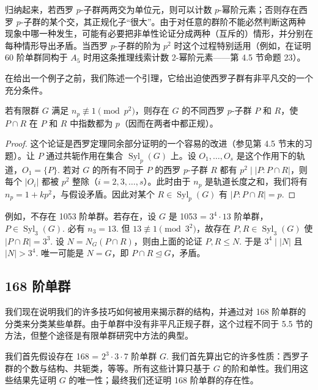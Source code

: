 归纳起来，若西罗 \(p\)-子群两两交为单位元，则可以计数 \(p\)-幂阶元素；否则存在西罗 \(p\)-子群的某个交，其正规化子“很大”。由于对任意的群阶不能必然判断这两种现象中哪一种发生，可能有必要把非单性论证分成两种（互斥的）情形，并分别在每种情形导出矛盾。当西罗 \(p\)-子群的阶为 \(p^2\) 时这个过程特别适用（例如，在证明 60 阶单群同构于 \(A_5\) 时用这条推理线索计数 2-幂阶元素——第 4.5 节命题 23）。

在给出一个例子之前，我们陈述一个引理，它给出迫使西罗子群有非平凡交的一个充分条件。

\begin{lemma}\label{lem:6.13}
若有限群 \(G\) 满足 \(n_p \not\equiv 1 \pmod{p^2}\)，则存在 \(G\) 的不同西罗 \(p\)-子群 \(P\) 和 \(R\)，使 \(P \cap R\) 在 \(P\) 和 \(R\) 中指数都为 \(p\)（因而在两者中都正规）。
\end{lemma}

\begin{proof}
这个论证是西罗定理同余部分证明的一个容易的改进（参见第 4.5 节末的习题）。让 \(P\) 通过共轭作用在集合 \(\operatorname{Syl}_p(G)\) 上。设 \(O_1, \ldots, O_s\) 是这个作用下的轨道，\(O_1 = \{P\}\). 若对 \(G\) 的所有不同于 \(P\) 的西罗 \(p\)-子群 \(R\) 都有 \(p^2 \mid |P : P \cap R|\)，则每个 \(|O_i|\) 都被 \(p^2\) 整除（\(i = 2, 3, \ldots, s\)）。此时由于 \(n_p\) 是轨道长度之和，我们将有 \(n_p = 1 + kp^2\)，与假设矛盾。因此对某个 \(R \in \operatorname{Syl}_p(G)\) 有 \(|P : P \cap R| = p\).
\end{proof}

例如，不存在 1053 阶单群。若存在，设 \(G\) 是 1053 = \(3^4 \cdot 13\) 阶单群，\(P \in \operatorname{Syl}_3(G)\). 必有 \(n_3 = 13\). 但 \(13 \not\equiv 1 \pmod{3^2}\)，故存在 \(P, R \in \operatorname{Syl}_3(G)\) 使 \(|P \cap R| = 3^3\). 设 \(N = N_G(P \cap R)\)，则由上面的论证 \(P, R \leq N\). 于是 \(3^4 \mid |N|\) 且 \(|N| > 3^4\). 唯一可能是 \(N = G\)，即 \(P \cap R \trianglelefteq G\)，矛盾。

\subsection*{168 阶单群}

我们现在说明我们的许多技巧如何被用来揭示群的结构，并通过对 168 阶单群的分类来分类某些单群。由于单群中没有非平凡正规子群，这个过程不同于 5.5 节的方法，但整个途径是有限单群研究中方法的典型。

我们首先假设存在 168 = \(2^3 \cdot 3 \cdot 7\) 阶单群 \(G\). 我们首先算出它的许多性质：西罗子群的个数与结构、共轭类，等等。所有这些计算只基于 \(G\) 的阶和单性。我们用这些结果先证明 \(G\) 的唯一性；最终我们还证明 168 阶单群的存在性。

